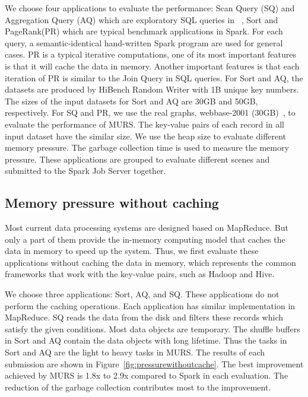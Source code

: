 We choose four applications to evaluate the performance: Scan Query (SQ) and Aggregation Query (AQ) which are exploratory SQL queries in ~\cite{www:benchmark}, Sort and  PageRank(PR) which are typical benchmark applications in Spark. For each query, a semantic-identical hand-written Spark program are used for general cases. PR is a typical iterative computations, one of its most important features is that it will cache the data in memory. Another important features is that each iteration of PR is similar to the Join Query in SQL queries.
For Sort and AQ, the datasets are produced by HiBench Random Writer with 1B unique key numbers. The sizes of the input datasets for Sort and AQ are 30GB and 50GB, respectively. For SQ and PR, we use the real graphs, webbase-2001 (30GB)~\cite{boldi:webgraph}, to evaluate the performance of MURS. The key-value pairs of each record in all input dataset have the similar size. We use the heap size to evaluate different memory pressure. The garbage collection time is used to measure the memory pressure. These applications are grouped to evaluate different scenes and submitted to the Spark Job Server together.

\subsection{Memory pressure without caching}

Most current data processing systems are designed based on MapReduce. But only a part of them provide the in-memory computing model that caches the data in memory to speed up the system. Thus, we first evaluate these applications without caching the data in memory, which represents the common frameworks that work with the key-value pairs, such as Hadoop and Hive.

We choose three applications: Sort, AQ, and SQ. These applications do not perform the caching operations. Each application has similar implementation in MapReduce. SQ reads the data from the disk and filters these records which satisfy the given conditions. Most data objects are temporary. The shuffle buffers in Sort and AQ contain the data objects with long lifetime. Thus the tasks in Sort and AQ are the light to heavy tasks in MURS. The results of each submission are shown in Figure~\ref{fig:pressurewithoutcache}. The best improvement achieved by MURS is 1.8x to 2.9x compared to Spark in each evaluation. The reduction of the garbage collection contributes most to the improvement.

